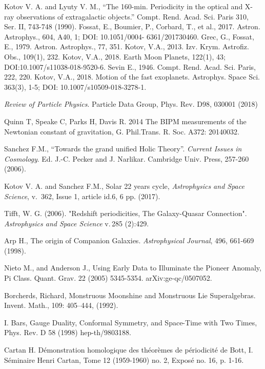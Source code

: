 \documentclass[twoside,draft]{article}
\begin{document}
\begin{sloppypar}
{\begin{thebibliography}{99}
 Kotov V. A. and Lyuty V. M., “The 160-min. Periodicity in the optical and X-ray observations of
extragalactic objects.” Compt. Rend. Acad. Sci. Paris 310, Ser. II, 743-748 (1990). Fossat, E.,
Boumier, P., Corbard, T., et al., 2017. Astron. Astrophys., 604, A40, 1; DOI: 10.1051/0004-
6361/201730460. Grec, G., Fossat, E., 1979. Astron. Astrophys., 77, 351. Kotov, V.A., 2013.
Izv. Krym. Astrofiz. Obs., 109(1), 232. Kotov, V.A., 2018. Earth Moon Planets, 122(1), 43;
DOI:10.1007/s11038-018-9520-6. Sevin E., 1946. Compt. Rend. Acad. Sci. Paris, 222, 220.
Kotov, V.A., 2018. Motion of the fast exoplanets. Astrophys. Space Sci. 363(3), 1-5; DOI:
10.1007/s10509-018-3278-1. %

 \textit{Review of Particle Physics}. Particle Data Group, Phys. Rev. D98, 030001 (2018)

 Quinn T, Speake C, Parks H, Davis R. 2014 The BIPM measurements of the Newtonian
constant of gravitation, G. Phil.Trans. R. Soc. A372: 20140032. %

 Sanchez F.M., “Towards the grand unified Holic Theory”. \textit{Current Issues in Cosmology}. Ed. J.-C.
Pecker and J. Narlikar. Cambridge Univ. Press, 257-260 (2006).

 Kotov V. A. and Sanchez F.M., Solar 22 years cycle, \textit{Astrophysics and Space Science}, v.\, 362,
Issue 1, article id.6, 6 pp. (2017).

 Tifft, W. G. (2006). "Redshift periodicities, The Galaxy-Quasar Connection". \textit{Astrophysics and
Space Science} v.\,285 (2):429.

 Arp H., The origin of Companion Galaxies. \textit{Astrophysical Journal}, 496, 661-669 (1998).

 Nieto M., and Anderson J., Using Early Data to Illuminate the Pioneer Anomaly, Pi Class.
Quant. Grav. 22 (2005) 5345-5354. arXiv:ge-qc/0507052.

 Borcherds, Richard, Monstruous Moonshine and Monstruous Lie Superalgebras. Invent.
Math., 109: 405–444, (1992).

 I. Bars, Gauge Duality, Conformal Symmetry, and Space-Time with Two Times, Phys. Rev. D
58 (1998) hep-th/9803188.

 Cartan H. Démonstration homologique des théorèmes de périodicité de Bott, I. Séminaire
Henri Cartan, Tome 12 (1959-1960) no. 2, Exposé no. 16, p. 1-16.


\end{thebibliography}}
\end{sloppypar}
\end{document}
